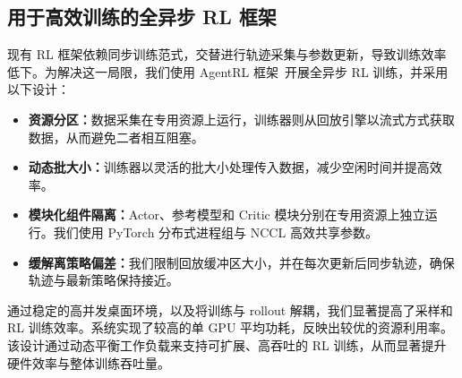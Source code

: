 \subsection{用于高效训练的全异步 RL 框架}\label{sec:full-asynchronous}
现有 RL 框架依赖同步训练范式，交替进行轨迹采集与参数更新，导致训练效率低下。为解决这一局限，我们使用 AgentRL 框架~\citep{zhang2025model}开展全异步 RL 训练，并采用以下设计：

\begin{itemize}[leftmargin=1.5em,itemsep=0pt,parsep=0.2em,topsep=0.0em,partopsep=0.0em]
    \item \textbf{资源分区：}数据采集在专用资源上运行，训练器则从回放引擎以流式方式获取数据，从而避免二者相互阻塞。
    \item \textbf{动态批大小：}训练器以灵活的批大小处理传入数据，减少空闲时间并提高效率。
    \item \textbf{模块化组件隔离：}Actor、参考模型和 Critic 模块分别在专用资源上独立运行。我们使用 PyTorch 分布式进程组与 NCCL 高效共享参数。
    \item \textbf{缓解离策略偏差：}我们限制回放缓冲区大小，并在每次更新后同步轨迹，确保轨迹与最新策略保持接近。
\end{itemize}

通过稳定的高并发桌面环境，以及将训练与 rollout 解耦，我们显著提高了采样和 RL 训练效率。系统实现了较高的单 GPU 平均功耗，反映出较优的资源利用率。该设计通过动态平衡工作负载来支持可扩展、高吞吐的 RL 训练，从而显著提升硬件效率与整体训练吞吐量。
